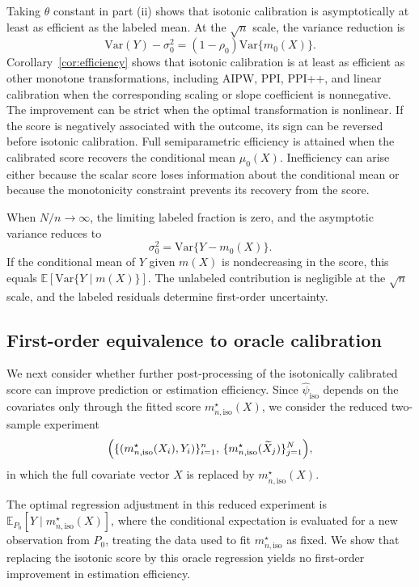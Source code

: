 \documentclass{article}
\theoremstyle{plain}
\theoremstyle{definition}
\newcommand{\E}{\mathbb{E}}
\newcommand{\Var}{\mathrm{Var}}
\newcommand{\1}{\mathbbm{1}}
\newcommand{\rhozero}{\rho_0}
\begin{document}
Taking \(\theta\) constant in part (ii) shows that isotonic calibration is
asymptotically at least as efficient as the labeled mean.
At the \(\sqrt n\) scale, the variance reduction is
\[\Var(Y)-\sigma_0^2=(1-\rhozero)\Var\{m_0(X)\}.\]
Corollary~\ref{cor:efficiency} shows that isotonic calibration
is at least as efficient as other monotone transformations,
including AIPW, PPI, PPI++, and linear calibration when
the corresponding scaling or slope coefficient is
nonnegative. The improvement can be strict when the optimal
transformation is nonlinear. If the score is negatively
associated with the outcome, its sign can be reversed before
isotonic calibration. Full semiparametric efficiency is
attained when the calibrated score recovers the conditional
mean $\mu_0(X)$. Inefficiency can arise either because the scalar score loses
information about the conditional mean or because the
monotonicity constraint prevents its recovery from the score.

When \(N/n\to\infty\), the limiting labeled fraction is zero, and the
asymptotic variance reduces to
\[
\sigma_0^2=\Var\{Y-m_0(X)\}.
\]
If the conditional mean of \(Y\) given \(m(X)\) is nondecreasing in the
score, this equals \(\E[\Var\{Y\mid m(X)\}]\). The unlabeled contribution
is negligible at the \(\sqrt n\) scale, and the labeled residuals determine
first-order uncertainty.

\subsection{First-order equivalence to oracle calibration}

We next consider whether further post-processing of the
isotonically calibrated score can improve prediction or
estimation efficiency. Since $\widehat{\psi}_{\mathrm{iso}}$
depends on the covariates only through the fitted score
$m_{n,\mathrm{iso}}^\star(X)$, we consider the reduced
two-sample experiment
\[
\Bigl(
\{(m_{n,\mathrm{iso}}^\star(X_i),Y_i)\}_{i=1}^n,\,
\{m_{n,\mathrm{iso}}^\star(\widetilde X_j)\}_{j=1}^N
\Bigr),
\]
in which the full covariate vector $X$ is replaced by
$m_{n,\mathrm{iso}}^\star(X)$.

The optimal regression adjustment in this reduced experiment
is $\E_{P_0}[Y\mid m_{n,\mathrm{iso}}^\star(X)]$, where the
conditional expectation is evaluated for a new observation from $P_0$, treating
the data used to fit
$m_{n,\mathrm{iso}}^\star$ as fixed. We show that replacing
the isotonic score by this oracle regression yields no
first-order improvement in estimation efficiency.
\end{document}
